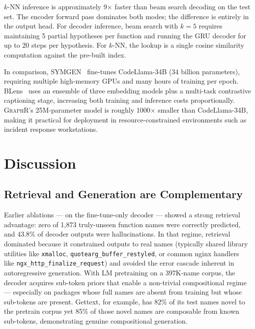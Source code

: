 \documentclass[sigconf,nonacm]{acmart}
\newcommand{\sysname}{\textsc{GraphR}}
\begin{document}
$k$-NN inference is approximately 9$\times$ faster than beam search decoding on the test set. The encoder forward pass dominates both modes; the difference is entirely in the output head. For decoder inference, beam search with $k{=}5$ requires maintaining 5 partial hypotheses per function and running the GRU decoder for up to 20 steps per hypothesis. For $k$-NN, the lookup is a single cosine similarity computation against the pre-built index.

In comparison, SYMGEN~\cite{symgen} fine-tunes CodeLlama-34B (34 billion parameters), requiring multiple high-memory GPUs and many hours of training per epoch. BLens~\cite{blens} uses an ensemble of three embedding models plus a multi-task contrastive captioning stage, increasing both training and inference costs proportionally. \sysname{}'s 25M-parameter model is roughly 1000$\times$ smaller than CodeLlama-34B, making it practical for deployment in resource-constrained environments such as incident response workstations.

\section{Discussion}
\label{sec:discussion}

\subsection{Retrieval and Generation are Complementary}

Earlier ablations --- on the fine-tune-only decoder --- showed a strong retrieval advantage: zero of 1{,}873 truly-unseen function names were correctly predicted, and 43.8\% of decoder outputs were hallucinations. In that regime, retrieval dominated because it constrained outputs to real names (typically shared library utilities like \texttt{xmalloc}, \texttt{quotearg\_buffer\_\allowbreak{}restyled}, or common nginx handlers like \texttt{ngx\_http\_\allowbreak{}finalize\_\allowbreak{}request}) and avoided the error cascade inherent in autoregressive generation. With LM pretraining on a 397K-name corpus, the decoder acquires sub-token priors that enable a non-trivial compositional regime --- especially on packages whose full names are absent from training but whose sub-tokens are present. Gettext, for example, has 82\% of its test names novel to the pretrain corpus yet 85\% of those novel names are composable from known sub-tokens, demonstrating genuine compositional generation.
\end{document}
